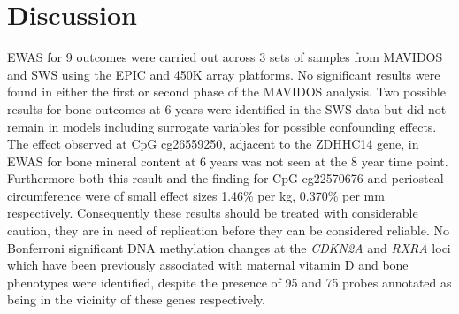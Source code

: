 \documentclass[
]{book}
\begin{document}
\hypertarget{arrayDiscussion}{%
\section{Discussion}\label{arrayDiscussion}}

EWAS for 9 outcomes were carried out across 3 sets of samples from MAVIDOS and SWS using the EPIC and 450K array platforms.
No significant results were found in either the first or second phase of the MAVIDOS analysis.
Two possible results for bone outcomes at 6 years were identified in the SWS data but did not remain in models including surrogate variables for possible confounding effects.
The effect observed at CpG cg26559250, adjacent to the ZDHHC14 gene, in EWAS for bone mineral content at 6 years was not seen at the 8 year time point.
Furthermore both this result and the finding for CpG cg22570676 and periosteal circumference were of small effect sizes 1.46\% per kg, 0.370\% per mm respectively.
Consequently these results should be treated with considerable caution, they are in need of replication before they can be considered reliable.
No Bonferroni significant DNA methylation changes at the \emph{CDKN2A} and \emph{RXRA} loci which have been previously associated with maternal vitamin D and bone phenotypes were identified, despite the presence of 95 and 75 probes annotated as being in the vicinity of these genes respectively.
\end{document}
